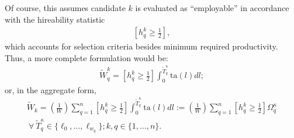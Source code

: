 \documentclass[hidelinks, nonatbib]{elsarticle}
\begin{document}
    Of course, this assumes candidate $k$ is evaluated as ``employable'' in accordance with the hireability statistic
    \begin{gather}
        \left[
            h_{q}^{k}
            \geq
            \frac{1}{2}
        \right]
        ,
    \end{gather}
    which accounts for selection criteria besides minimum required productivity. Thus, a more complete formulation would be:
    \begin{gather}
        \tilde{W}_{q}^{k}
        =
        \left[
            h_{q}^{k}
            \geq
            \frac{1}{2}
        \right]
        \int_{0}^{\tilde{T}_{q}^{\kappa}}
        \text{ta}(l)
        dl
        ;
    \end{gather}
    or, in the aggregate form,
    \begin{gather}
        \tilde{W}_k 
        = 
        \left(
            \frac{1}{W}
        \right)
        \sum_{q=1}^{n}
        \left[
            h_{q}^{k}
            \geq
            \frac{1}{2}
        \right]
        \int_{0}^{\tilde{T}_{q}^{\kappa}}
        \text{ta}(l)
        dl
        :=
        \left(
            \frac{1}{W}
        \right)
        \sum_{q=1}^{n}
        \left[
            h_{q}^{k}
            \geq
            \frac{1}{2}
        \right]
        \Omega_{q}^{\kappa}
        \\
        \
        \forall
        \
        \tilde{T}_{q}^{\kappa} \in \{
            \ell_{0}, 
            \dots, 
            \ell_{w_q}
        \}
        ;
        k,q \in \{1, \dots, n\}
        .
    \end{gather}
\end{document}
